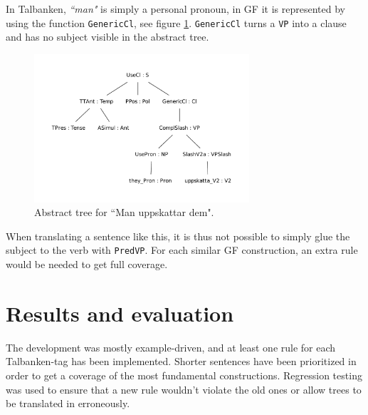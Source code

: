 \documentclass{report}
\begin{document}
In Talbanken, \emph{``man"} is simply a personal pronoun, 
in GF it is represented by using the function \verb|GenericCl|, see figure
\ref{fig:mappMan}. \verb|GenericCl| turns a \verb-VP- into a clause and has no
subject visible in the abstract tree. 
\begin{figure}[h]
\centering
\includegraphics[width=80mm]{man.pdf}
\caption{Abstract tree for ``Man uppskattar dem".}
\label{fig:mappMan}
\end{figure}
When translating a sentence like this, it is thus not possible to simply glue the
subject to the verb with \verb|PredVP|. For each similar GF construction, an extra rule
would be needed to get full coverage. \\ %

%

\section{Results and evaluation}
The development was mostly example-driven, and at least one rule for each
Talbanken-tag has been implemented.
Shorter sentences have been prioritized in order to get a coverage of the most
fundamental constructions. 
Regression testing was used to ensure that a new rule wouldn't violate the old ones
or allow trees to be translated in erroneously.
\end{document}

